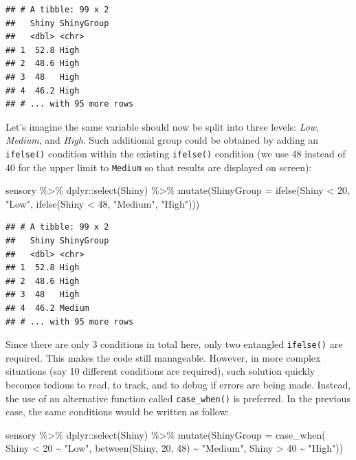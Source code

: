 \documentclass[
]{krantz}
\makeatletter
\newenvironment{Shaded}{\begin{snugshade}}{\end{snugshade}}
\newcommand{\AttributeTok}[1]{\textcolor[rgb]{0.61,0.61,0.61}{#1}}
\newcommand{\DecValTok}[1]{\textcolor[rgb]{0.06,0.06,0.06}{#1}}
\newcommand{\FunctionTok}[1]{\textcolor[rgb]{0,0,0}{#1}}
\newcommand{\NormalTok}[1]{#1}
\newcommand{\SpecialCharTok}[1]{\textcolor[rgb]{0,0,0}{#1}}
\newcommand{\StringTok}[1]{\textcolor[rgb]{0.5,0.5,0.5}{#1}}
\newenvironment{kframe}{%
\medskip{}
\setlength{\fboxsep}{.8em}
 \def\at@end@of@kframe{}%
 \ifinner\ifhmode%
  \def\at@end@of@kframe{\end{minipage}}%
  \begin{minipage}{\columnwidth}%
 \fi\fi%
 \def\FrameCommand##1{\hskip\@totalleftmargin \hskip-\fboxsep
 \colorbox{shadecolor}{##1}\hskip-\fboxsep
     \hskip-\linewidth \hskip-\@totalleftmargin \hskip\columnwidth}%
 \MakeFramed {\advance\hsize-\width
   \@totalleftmargin\z@ \linewidth\hsize
   \@setminipage}}%
 {\par\unskip\endMakeFramed%
 \at@end@of@kframe}
\renewenvironment{Shaded}{\begin{kframe}}{\end{kframe}}
\makeatother
\begin{document}
\begin{verbatim}
## # A tibble: 99 x 2
##   Shiny ShinyGroup
##   <dbl> <chr>     
## 1  52.8 High      
## 2  48.6 High      
## 3  48   High      
## 4  46.2 High      
## # ... with 95 more rows
\end{verbatim}

Let's imagine the same variable should now be split into three levels: \emph{Low}, \emph{Medium}, and \emph{High}. Such additional group could be obtained by adding an \texttt{ifelse()} condition within the existing \texttt{ifelse()} condition (we use 48 instead of 40 for the upper limit to \texttt{Medium} so that results are displayed on screen):

\begin{Shaded}
\begin{Highlighting}[]
\NormalTok{sensory }\SpecialCharTok{\%\textgreater{}\%}
\NormalTok{  dplyr}\SpecialCharTok{::}\FunctionTok{select}\NormalTok{(Shiny) }\SpecialCharTok{\%\textgreater{}\%}
  \FunctionTok{mutate}\NormalTok{(}\AttributeTok{ShinyGroup =} \FunctionTok{ifelse}\NormalTok{(Shiny }\SpecialCharTok{\textless{}} \DecValTok{20}\NormalTok{, }\StringTok{"Low"}\NormalTok{,}
                             \FunctionTok{ifelse}\NormalTok{(Shiny }\SpecialCharTok{\textless{}} \DecValTok{48}\NormalTok{, }\StringTok{"Medium"}\NormalTok{, }\StringTok{"High"}\NormalTok{)))}
\end{Highlighting}
\end{Shaded}

\begin{verbatim}
## # A tibble: 99 x 2
##   Shiny ShinyGroup
##   <dbl> <chr>     
## 1  52.8 High      
## 2  48.6 High      
## 3  48   High      
## 4  46.2 Medium    
## # ... with 95 more rows
\end{verbatim}

Since there are only 3 conditions in total here, only two entangled \texttt{ifelse()} are required. This makes the code still manageable. However, in more complex situations (say 10 different conditions are required), such solution quickly becomes tedious to read, to track, and to debug if errors are being made. Instead, the use of an alternative function called \texttt{case\_when()} is preferred. In the previous case, the same conditions would be written as follow:

\begin{Shaded}
\begin{Highlighting}[]
\NormalTok{sensory }\SpecialCharTok{\%\textgreater{}\%}
\NormalTok{  dplyr}\SpecialCharTok{::}\FunctionTok{select}\NormalTok{(Shiny) }\SpecialCharTok{\%\textgreater{}\%}
  \FunctionTok{mutate}\NormalTok{(}\AttributeTok{ShinyGroup =} \FunctionTok{case\_when}\NormalTok{(}
\NormalTok{    Shiny }\SpecialCharTok{\textless{}} \DecValTok{20} \SpecialCharTok{\textasciitilde{}} \StringTok{"Low"}\NormalTok{,}
    \FunctionTok{between}\NormalTok{(Shiny, }\DecValTok{20}\NormalTok{, }\DecValTok{48}\NormalTok{) }\SpecialCharTok{\textasciitilde{}} \StringTok{"Medium"}\NormalTok{,}
\NormalTok{    Shiny }\SpecialCharTok{\textgreater{}} \DecValTok{40} \SpecialCharTok{\textasciitilde{}} \StringTok{"High"}\NormalTok{))}
\end{Highlighting}
\end{Shaded}
\end{document}
